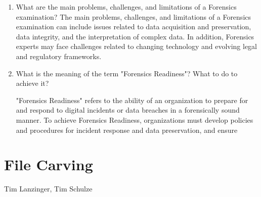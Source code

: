 \documentclass{scrreprt}
\begin{document}
\begin{enumerate}
\item What are the main problems, challenges, and limitations of a Forensics examination? 
The main problems, challenges, and limitations of a Forensics examination can include issues related to data acquisition and preservation, data integrity, and the interpretation of complex data. In addition, Forensics experts may face challenges related to changing technology and evolving legal and regulatory frameworks.
\item What is the meaning of the term "Forensics Readiness"? What to do to achieve it? 

"Forensics Readiness" refers to the ability of an organization to prepare for and respond to digital incidents or data breaches in a forensically sound manner. To achieve Forensics Readiness, organizations must develop policies and procedures for incident response and data preservation, and ensure
\end{enumerate}


\chapter{File Carving}
Tim Lanzinger, Tim Schulze
\end{document}
